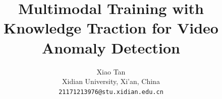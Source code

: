 \documentclass[10pt,twocolumn,letterpaper]{article}
\title{Multimodal Training with Knowledge Traction for Video Anomaly Detection}
\author{Xiao Tan\\
Xidian University, Xi'an, China\\
{\tt\small 21171213976@stu.xidian.edu.cn}}
\begin{document}
\maketitle






{
    \small
    
    
}


\end{document}
